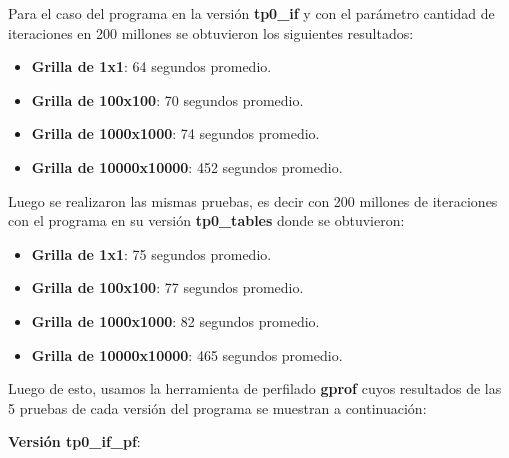 \documentclass[a4paper, 10pt, twoside, notitlepage]{article}
\begin{document}
Para el caso del programa en la versión \textbf{tp0\_if} y con el parámetro cantidad de iteraciones en 200 millones se obtuvieron los siguientes resultados:

\begin{itemize} 
\item[] \textbf{Grilla de 1x1}: 64 segundos promedio.
\item[] \textbf{Grilla de 100x100}: 70 segundos promedio.
\item[] \textbf{Grilla de 1000x1000}: 74 segundos promedio.
\item[] \textbf{Grilla de 10000x10000}: 452 segundos promedio.
\end{itemize}

Luego se realizaron las mismas pruebas, es decir con 200 millones de iteraciones con el programa en su versión \textbf{tp0\_tables} donde se obtuvieron: 
\begin{itemize} 
\item[] \textbf{Grilla de 1x1}: 75 segundos promedio.
\item[] \textbf{Grilla de 100x100}: 77 segundos promedio.
\item[] \textbf{Grilla de 1000x1000}: 82 segundos promedio.
\item[] \textbf{Grilla de 10000x10000}: 465 segundos promedio.
\end{itemize}

Luego de esto, usamos la herramienta de perfilado \textbf{gprof} cuyos resultados de las 5 pruebas de cada versión del programa se muestran a continuación:

\textbf{Versión tp0\_if\_pf}:
\end{document}
